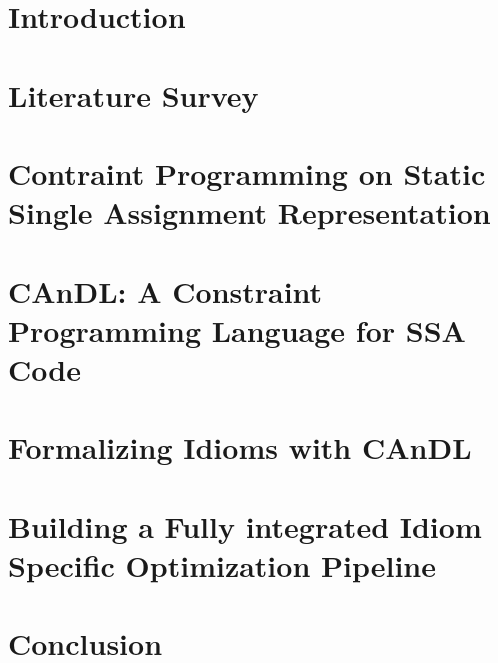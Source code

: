 \documentclass[phd,icsa,twoside,logo,11pt]{infthesis}
\begin{document}
\chapter{Introduction}
    

\chapter{Literature Survey}
    

\chapter{Contraint Programming on Static Single Assignment Representation}
    

\chapter{CAnDL: A Constraint Programming Language for SSA Code}
    

\chapter{Formalizing Idioms with CAnDL}
    

\chapter{Building a Fully integrated Idiom Specific Optimization Pipeline}
    

\chapter{Conclusion}


\end{document}
